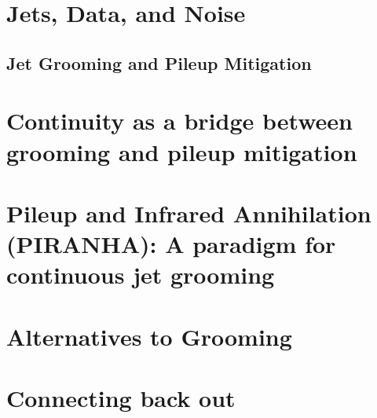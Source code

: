 \section{Jets, Data, and Noise}

\subsection{Jet Grooming and Pileup Mitigation}


\section{Continuity as a bridge between grooming and pileup mitigation}


\section{Pileup and Infrared Annihilation (PIRANHA): A paradigm for continuous jet grooming}


\section{Alternatives to Grooming}


\section{Connecting back out}
